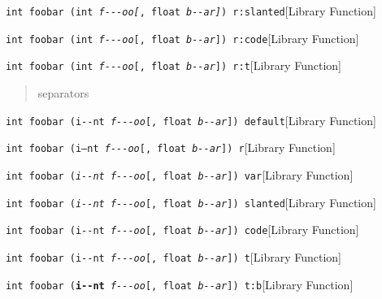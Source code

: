 \documentclass{book}
\begin{document}
%
\noindent\texttt{int foobar (int \textsl{f{-}{-}{-}oo}\textnormal{\textsl{[}}, float \textsl{b{-}{-}ar}\textnormal{\textsl{]}}) r:slanted}\hfill[Library Function]



%
\noindent\texttt{int foobar (int \textsl{f{-}{-}{-}oo}\textnormal{\texttt{[}}, float \textsl{b{-}{-}ar}\textnormal{\texttt{]}}) r:code}\hfill[Library Function]



%
\noindent\texttt{int foobar (int \textsl{f{-}{-}{-}oo}\textnormal{\texttt{[}}, float \textsl{b{-}{-}ar}\textnormal{\texttt{]}}) r:t}\hfill[Library Function]



%
\begin{quote}
\unskip{\parskip=0pt\noindent}%
separators
\end{quote}

\noindent\texttt{int foobar (i{-}{-}nt \textsl{f{-}{-}{-}oo}[, float \textsl{b{-}{-}ar}]) default}\hfill[Library Function]



%
\noindent\texttt{int foobar (\textnormal{i--nt} \textsl{f{-}{-}{-}oo}[, float \textsl{b{-}{-}ar}]) r}\hfill[Library Function]



%
\noindent\texttt{int foobar (\textsl{i{-}{-}nt} \textsl{f{-}{-}{-}oo}[, float \textsl{b{-}{-}ar}]) var}\hfill[Library Function]



%
\noindent\texttt{int foobar (\textsl{i{-}{-}nt} \textsl{f{-}{-}{-}oo}[, float \textsl{b{-}{-}ar}]) slanted}\hfill[Library Function]



%
\noindent\texttt{int foobar (\texttt{i{-}{-}nt} \textsl{f{-}{-}{-}oo}[, float \textsl{b{-}{-}ar}]) code}\hfill[Library Function]



%
\noindent\texttt{int foobar (\texttt{i{-}{-}nt} \textsl{f{-}{-}{-}oo}[, float \textsl{b{-}{-}ar}]) t}\hfill[Library Function]



%
\noindent\texttt{int foobar (\texttt{\textbf{i{-}{-}nt}} \textsl{f{-}{-}{-}oo}[, float \textsl{b{-}{-}ar}]) t:b}\hfill[Library Function]
\end{document}
